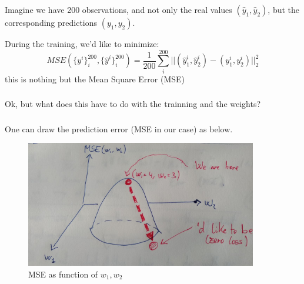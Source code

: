 \documentclass{beamer}
\begin{document}
\begin{frame}
    \frametitle{\insertsection}
    \framesubtitle{\insertsubsection}

    Imagine we have 200 observations, and not only the real values $(\hat{y}_1,\hat{y}_2)$, but the corresponding predictions $(y_1,y_2)$.

    \vfill
    During the training, we'd like to minimize:
    \begin{equation}
        MSE\left(\{y^i\}_i^{200},\{\hat{y}^i\}_i^{200}\right)=\frac{1}{200}\sum_i^{200} ||(\hat{y}_1^i,\hat{y}_2^i) - (y_1^i, y_2^i)||_2^2
        \label{eq:mse}
    \end{equation}
    this is nothing but the Mean Square Error (MSE)

\end{frame}




\begin{frame}
    \frametitle{\insertsection}
    \framesubtitle{\insertsubsection}

    Ok, but what does this have to do with the trainning and the weights?



\end{frame}



\begin{frame}
    \frametitle{\insertsection}
    \framesubtitle{\insertsubsection}

    One can draw the prediction error (MSE in our case) as below.


    \begin{figure}
        \centering
        \includegraphics[width=0.9\textwidth]{img/gradient-descend.jpg}
        \caption{MSE as function of $w_1,w_2$}
        \label{fig:trained-nn-2}
    \end{figure}
\end{frame}
\end{document}
